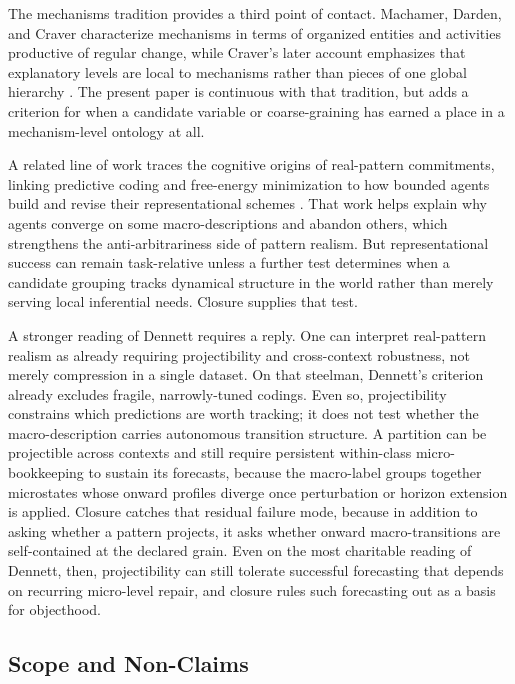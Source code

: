 The mechanisms tradition provides a third point of contact. Machamer,
Darden, and Craver characterize mechanisms in terms of organized
entities and activities productive of regular change, while Craver's
later account emphasizes that explanatory levels are local to
mechanisms rather than pieces of one global hierarchy
\citep{machamer2000,craver2007}. The present paper is continuous with
that tradition, but adds a criterion for when a candidate variable or
coarse-graining has earned a place in a mechanism-level ontology at all.

A related line of work traces the cognitive origins of real-pattern
commitments, linking predictive coding and free-energy minimization to
how bounded agents build and revise their representational schemes
\citep{gladziejewski2025}. That work helps explain why agents converge on
some macro-descriptions and abandon others, which strengthens the
anti-arbitrariness side of pattern realism. But representational success
can remain task-relative unless a further test determines when a
candidate grouping tracks dynamical structure in the world rather than
merely serving local inferential needs. Closure supplies that test.

A stronger reading of Dennett requires a reply. One can
interpret real-pattern realism as already requiring projectibility and
cross-context robustness, not merely compression in a single dataset.
On that steelman, Dennett's criterion already excludes fragile,
narrowly-tuned codings. Even so, projectibility constrains which
predictions are worth tracking; it does not test whether the
macro-description carries autonomous transition structure. A partition
can be projectible across contexts and still require persistent
within-class micro-bookkeeping to sustain its forecasts, because the
macro-label groups together microstates whose onward profiles diverge
once perturbation or horizon extension is applied. Closure catches
that residual failure mode, because in addition to asking whether a
pattern projects, it asks whether onward macro-transitions are
self-contained at the declared grain. Even on the most charitable
reading of Dennett, then, projectibility can still tolerate successful
forecasting that depends on recurring micro-level repair, and closure
rules such forecasting out as a basis for objecthood.

\subsection{Scope and Non-Claims}\label{scope-and-non-claims}

